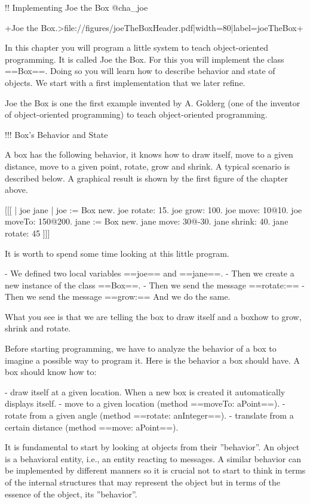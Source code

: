 !! Implementing Joe the Box
@cha_joe

+Joe the Box.>file://figures/joeTheBoxHeader.pdf|width=80|label=joeTheBox+ 

In this chapter you will program a little system to teach object-oriented programming. It is called Joe the Box. For this you will implement the class ==Box==. Doing so you will learn how to describe behavior and state of
objects.  We start with a first implementation that we later refine. 

Joe the Box is one the first example invented by A. Golderg (one of the inventor of object-oriented programming) to teach object-oriented programming.

!!! Box's Behavior and State

A box has the following behavior, it knows how to draw itself, move to
a given distance, move to a given point, rotate, grow and shrink.  A
typical scenario is described below. A graphical result is shown by the first figure of the chapter above.

[[[
| joe jane |
joe := Box new.
joe rotate: 15.
joe grow: 100.
joe move: 10@10.
joe moveTo: 150@200. 
jane := Box new.
jane move: 30@-30.
jane shrink: 40.
jane rotate: 45
]]]

It is worth to spend some time looking at this little program. 

- We defined two local variables ==joe== and ==jane==.
- Then we create a new instance of the class ==Box==.
- Then we send the message ==rotate:==
- Then we send the message ==grow:==  
And we do the same.

What you see is that we are telling the box to draw itself and a boxhow to grow, shrink and rotate.

Before starting programming, we have to analyze the behavior of a box 
to imagine a possible way to program it. Here is the 
behavior a box should have. A box should know how to:

- draw itself at a given location. When a new box is created it automatically displays itself. 
- move to a given location (method ==moveTo: aPoint==).
- rotate from a given angle (method ==rotate: anInteger==).
- translate from a certain distance (method ==move: aPoint==).

It is fundamental to start by looking at objects from their
''behavior''.  An object is a behavioral entity, i.e., an
entity reacting to messages.  A similar behavior can be implemented by
different manners so it is crucial not to start to think in terms of
the internal structures that may represent the object but in
terms of the essence of the object, its ''behavior''.  


